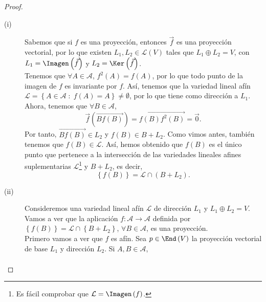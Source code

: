\begin{proof}
\begin{description}
\item[(i)] Sabemos que si $\displaystyle f $ es una proyección, entonces $\displaystyle \vec{f} $ es una proyección vectorial, por lo que existen $\displaystyle L_{1}, L_{2} \in \mathcal{L}\left(V\right) $ tales que $\displaystyle L_{1}\oplus L_{2} = V $, con $\displaystyle L_{1} = \Imagen\left(\vec{f}\right) $ y $\displaystyle L_{2} = \Ker\left(\vec{f}\right) $. \\
	Tenemos que $\displaystyle \forall A \in \mathcal{A} $, $\displaystyle f^{2}\left(A\right) = f\left(A\right) $, por lo que todo punto de la imagen de $\displaystyle f $ es invariante por $\displaystyle f $. Así, tenemos que la variedad lineal afín $\displaystyle \mathcal{L} = \left\{ A \in \mathcal{A} \; : \; f\left(A\right) = A\right\}  \neq \emptyset $, por lo que tiene como dirección a $\displaystyle L_{1} $. \\
	Ahora, tenemos que $\displaystyle \forall B \in \mathcal{A} $, 
	\[ \vec{f}\left(\overrightarrow{Bf\left(B\right)}\right) = \overrightarrow{f\left(B\right)f^{2}\left(B\right)} = \vec{0} .\]
	Por tanto, $\displaystyle \overrightarrow{Bf\left(B\right)} \in L_{2} $ y $\displaystyle f\left(B\right) \in B + L_{2} $. Como vimos antes, también tenemos que $\displaystyle f\left(B\right) \in \mathcal{L} $. Así, hemos obtenido que $\displaystyle f\left(B\right) $ es el único punto que pertenece a la intersección de las variedades lineales afines suplementarias $\displaystyle \mathcal{L} $\footnote{Es fácil comprobar que $\displaystyle \mathcal{L} = \Imagen\left(f\right) $.}  y $\displaystyle B + L_{2} $, es decir, 
	\[ \left\{ f\left(B\right)\right\} = \mathcal{L} \cap \left(B + L_{2}\right) .\]
\item[(ii)] Consideremos una variedad lineal afín $\displaystyle \mathcal{L} $ de dirección $\displaystyle L_{1} $ y $\displaystyle L_{1} \oplus L_{2} = V $. Vamos a ver que la aplicación $\displaystyle f : \mathcal{A} \to \mathcal{A}$ definida por $\displaystyle \left\{ f\left(B\right)\right\} = \mathcal{L} \cap \left\{ B + L_{2}\right\}  $, $\displaystyle \forall B \in \mathcal{A} $, es una proyección. \\
	Primero vamos a ver que $\displaystyle f $ es afín. Sea $\displaystyle p \in \End\left(V\right) $ la proyección vectorial de base $\displaystyle L_{1} $ y dirección $\displaystyle L_{2} $. Si $\displaystyle A,B \in \mathcal{A} $, 
\[
\begin{split}

\end{split}\]
\end{description}
\end{proof}
